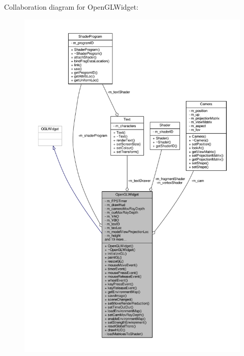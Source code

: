Collaboration diagram for Open\-G\-L\-Widget\-:
\nopagebreak
\begin{figure}[H]
\begin{center}
\leavevmode
\includegraphics[width=350pt]{class_open_g_l_widget__coll__graph}
\end{center}
\end{figure}
